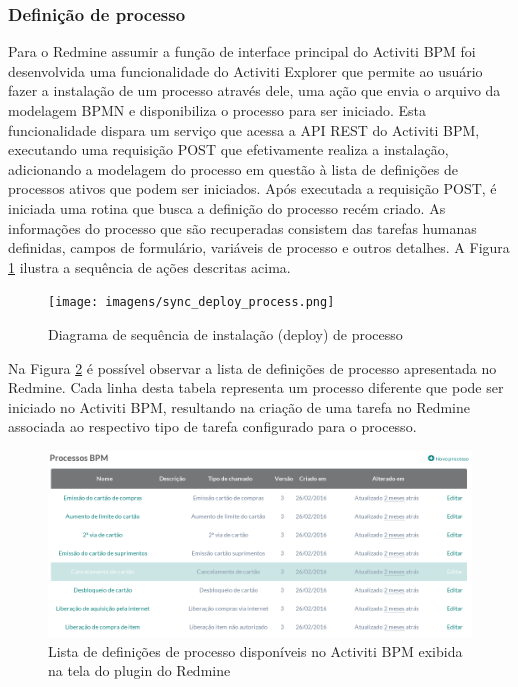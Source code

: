 \subsubsection{Definição de processo}\label{sec:integracao_redmine_activiti_sincronizacao-deploy_processo}

Para o Redmine assumir a função de interface principal do Activiti BPM foi desenvolvida uma funcionalidade do Activiti Explorer que permite ao usuário fazer a instalação de um processo através dele, uma ação que envia o arquivo da modelagem BPMN e disponibiliza o processo para ser iniciado. Esta funcionalidade dispara um serviço que acessa a API REST do Activiti BPM, executando uma requisição POST que efetivamente realiza a instalação, adicionando a modelagem do processo em questão à lista de definições de processos ativos que podem ser iniciados. 
Após executada a requisição POST, é iniciada uma rotina que busca a definição do processo recém criado. As informações do processo que são recuperadas consistem das tarefas humanas definidas, campos de formulário, variáveis de processo e outros detalhes.
A Figura \ref{fig:sync_deploy_process} ilustra a sequência de ações descritas acima.

\begin{figure}[H]
\centering
\texttt{[image: imagens/sync\_deploy\_process.png]}
\caption{Diagrama de sequência de instalação (deploy) de processo}
\label{fig:sync_deploy_process}
\end{figure}

Na Figura \ref{fig:process_list} é possível observar a lista de definições de processo apresentada no Redmine. Cada linha desta tabela representa um processo diferente que pode ser iniciado no Activiti BPM, resultando na criação de uma tarefa no Redmine associada ao respectivo tipo de tarefa configurado para o processo.

\begin{figure}[H]
\centering
\includegraphics[width=1\textwidth]{imagens/plugin_process_list.png}
\caption{Lista de definições de processo disponíveis no Activiti BPM exibida na tela do plugin do Redmine}
\label{fig:process_list}
\end{figure}

